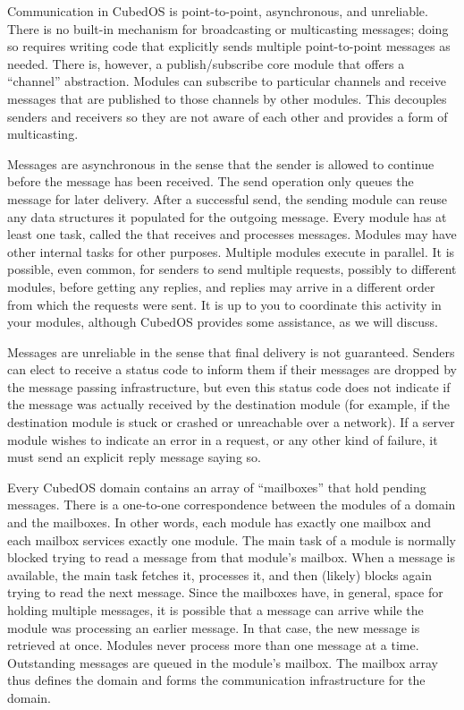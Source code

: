 Communication in CubedOS is point-to-point, asynchronous, and unreliable. There is no built-in
mechanism for broadcasting or multicasting messages; doing so requires writing code that
explicitly sends multiple point-to-point messages as needed. There is, however, a
publish/subscribe core module that offers a ``channel'' abstraction. Modules can subscribe to
particular channels and receive messages that are published to those channels by other modules.
This decouples senders and receivers so they are not aware of each other and provides a form of
multicasting.

Messages are asynchronous in the sense that the sender is allowed to continue before the message
has been received. The send operation only queues the message for later delivery. After a
successful send, the sending module can reuse any data structures it populated for the outgoing
message. Every module has at least one task, called the  that receives
and processes messages. Modules may have other internal tasks for other purposes. Multiple
modules execute in parallel. It is possible, even common, for senders to send multiple requests,
possibly to different modules, before getting any replies, and replies may arrive in a different
order from which the requests were sent. It is up to you to coordinate this activity in your
modules, although CubedOS provides some assistance, as we will discuss.

Messages are unreliable in the sense that final delivery is not guaranteed. Senders can elect to
receive a status code to inform them if their messages are dropped by the message passing
infrastructure, but even this status code does not indicate if the message was actually received
by the destination module (for example, if the destination module is stuck or crashed or
unreachable over a network). If a server module wishes to indicate an error in a request, or any
other kind of failure, it must send an explicit reply message saying so.

Every CubedOS domain contains an array of ``mailboxes'' that hold pending messages. There is a
one-to-one correspondence between the modules of a domain and the mailboxes. In other words,
each module has exactly one mailbox and each mailbox services exactly one module. The main task
of a module is normally blocked trying to read a message from that module's mailbox. When a
message is available, the main task fetches it, processes it, and then (likely) blocks again
trying to read the next message. Since the mailboxes have, in general, space for holding
multiple messages, it is possible that a message can arrive while the module was processing an
earlier message. In that case, the new message is retrieved at once. Modules never process more
than one message at a time. Outstanding messages are queued in the module's mailbox. The mailbox
array thus defines the domain and forms the communication infrastructure for the domain.

